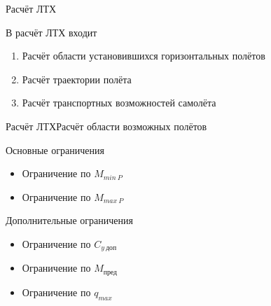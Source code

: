 \begin{frame}{Расчёт ЛТХ}
\begin{block}{В расчёт ЛТХ входит}
   \begin{enumerate}
    \item Расчёт области установившихся горизонтальных полётов  
    \item Расчёт траектории полёта 
    \item Расчёт транспортных возможностей самолёта
   \end{enumerate}
\end{block}
\end{frame}

\begin{frame}{Расчёт ЛТХ}{Расчёт области возможных полётов}

    \begin{block}{Основные ограничения}
        \begin{itemize}
            \item Ограничение по $M_{min \ P}$ 
            \item Ограничение по $M_{max \ P}$
        \end{itemize}
    \end{block}

    \begin{block}{Дополнительные ограничения}
        \begin{itemize}
            \item Ограничение по $C_{y \ \text{доп}}$
            \item Ограничение по $M_\text{пред}$
            \item Ограничение по $q_{max}$
        \end{itemize}
    \end{block}

\end{frame}

